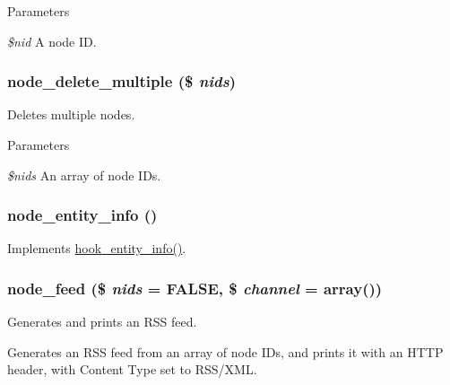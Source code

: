 \begin{DoxyParams}{Parameters}
\item[{\em \$nid}]A node ID. \end{DoxyParams}
\hypertarget{node_8module_ab7b4bed8dc18cfa2d8e1839b0429effa}{
\subsubsection[{node\_\-delete\_\-multiple}]{\setlength{\rightskip}{0pt plus 5cm}node\_\-delete\_\-multiple (\$ {\em nids})}}
\label{node_8module_ab7b4bed8dc18cfa2d8e1839b0429effa}
Deletes multiple nodes.


\begin{DoxyParams}{Parameters}
\item[{\em \$nids}]An array of node IDs. \end{DoxyParams}
\hypertarget{node_8module_aaf9f722394e2a25a4bd17e53d9923bfa}{
\subsubsection[{node\_\-entity\_\-info}]{\setlength{\rightskip}{0pt plus 5cm}node\_\-entity\_\-info ()}}
\label{node_8module_aaf9f722394e2a25a4bd17e53d9923bfa}
Implements \hyperlink{group__hooks_gaf02318e9d0e8cdbf6d187b271b9969a8}{hook\_\-entity\_\-info()}. \hypertarget{node_8module_acad30bd6d2afbf584f622957c8f4718f}{
\subsubsection[{node\_\-feed}]{\setlength{\rightskip}{0pt plus 5cm}node\_\-feed (\$ {\em nids} = {\ttfamily FALSE}, \/  \$ {\em channel} = {\ttfamily array()})}}
\label{node_8module_acad30bd6d2afbf584f622957c8f4718f}
Generates and prints an RSS feed.

Generates an RSS feed from an array of node IDs, and prints it with an HTTP header, with Content Type set to RSS/XML.


